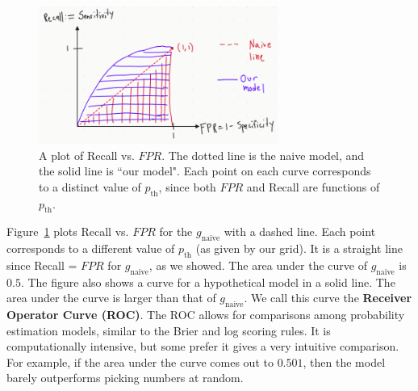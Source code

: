 \documentclass[12pt, a4paper]{article}
\theoremstyle{definition}
\begin{document}
	\begin{figure}
		\centering
		\includegraphics[width=0.7\textwidth]{receiver-operator-curve}
		\caption{A plot of Recall vs. $FPR$. The dotted line is the naive
		model, and the solid line is ``our model". Each point on each curve
		corresponds to a distinct value of $p_{\text{th}}$, since both
		$FPR$ and Recall are functions of $p_{\text{th}}$.}
		\label{fig:receiver-operator-curve}
	\end{figure}
	
	Figure~\ref{fig:receiver-operator-curve} plots Recall vs. $FPR$ for
	the $g_{\text{naive}}$ with a dashed line. Each point corresponds to
	a different value of $p_{\text{th}}$ (as given by our grid). It is
	a straight line since Recall = $FPR$ for $g_{\text{naive}}$, as we
	showed. The area under the curve of $g_{\text{naive}}$ is $0.5$.
	The figure also shows a curve for a hypothetical model in a solid line.
	The area under the curve is larger than that of $g_{\text{naive}}$.
	We call this curve the \textbf{Receiver Operator Curve (ROC)}.
	The ROC allows for comparisons among probability estimation models,
	similar to the Brier and log scoring rules. It is computationally
	intensive, but some prefer it gives a very intuitive comparison.
	For example, if the area under the curve comes out to $0.501$, then
	the model barely outperforms picking numbers at random.
	
\end{document}
